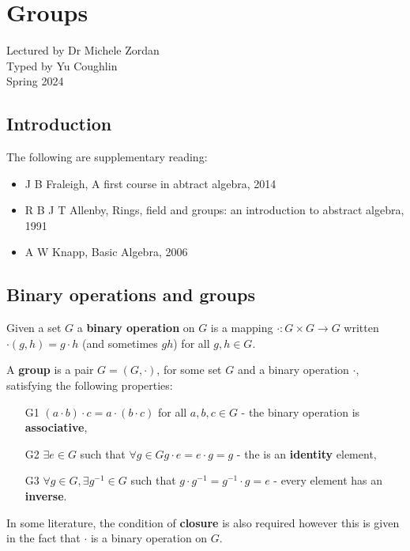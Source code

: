 \documentclass[../Year1/Year1.tex]{subfiles}
\begin{document}
\chapter{Groups}
\renewcommand*\thesection{\arabic{section}}
\setcounter{section}{-1}
Lectured by Dr Michele Zordan \\ Typed by Yu Coughlin \\
Spring 2024

\section{Introduction}


The following are supplementary reading:
\begin{itemize}
    \item J B Fraleigh, A first course in abtract algebra, 2014
    \item R B J T Allenby, Rings, field and groups: an introduction to abstract algebra, 1991
    \item A W Knapp, Basic Algebra, 2006
\end{itemize}

\tableofcontents\pagebreak

\section{Binary operations and groups}

\begin{definition}
    Given a set $G$ a \textbf{binary operation} on $G$ is a mapping $\cdot: G\times G \rightarrow G$ written $\cdot(g,h) = g\cdot h$ (and sometimes $gh$) for all $g,h\in G$.
\end{definition}

\begin{definition}[Group]
    A \textbf{group} is a pair $G=(G,\cdot)$, for some set $G$ and a binary operation $\cdot$, satisfying the following properties: \begin{enumerate}
        \item[G1] $(a\cdot b)\cdot c = a \cdot (b\cdot c)$ for all $a,b,c\in G$ - the binary operation is \textbf{associative},
        \item[G2] $\exists e\in G$ such that $\forall g\in G g\cdot e = e\cdot g = g $ - the is an \textbf{identity} element,
        \item[G3] $\forall g\in G, \exists g^{-1} \in G$ such that $g\cdot g^{-1} = g^{-1}\cdot g = e$ - every element has an \textbf{inverse}.
    \end{enumerate}
    In some literature, the condition of \textbf{closure} is also required however this is given in the fact that $\cdot$ is a binary operation on $G$.
\end{definition}
\end{document}
